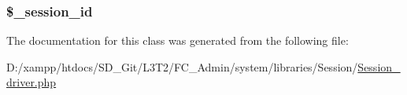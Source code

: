 \subsubsection[{\$\+\_\+session\+\_\+id}]{\setlength{\rightskip}{0pt plus 5cm}\$\+\_\+session\+\_\+id\hspace{0.3cm}{\ttfamily [protected]}}\label{class_c_i___session__driver_a92023c94926d17b1f6705c8b1d35a103}


The documentation for this class was generated from the following file\+:\begin{DoxyCompactItemize}
\item 
D\+:/xampp/htdocs/\+S\+D\+\_\+\+Git/\+L3\+T2/\+F\+C\+\_\+\+Admin/system/libraries/\+Session/\hyperlink{_session__driver_8php}{Session\+\_\+driver.\+php}\end{DoxyCompactItemize}
